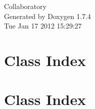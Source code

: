 \documentclass[a4paper]{book}
\begin{document}
\hypersetup{pageanchor=false}
\begin{titlepage}
\vspace*{7cm}
\begin{center}
{\Large Collaboratory }\\
\vspace*{1cm}
{\large Generated by Doxygen 1.7.4}\\
\vspace*{0.5cm}
{\small Tue Jan 17 2012 15:29:27}\\
\end{center}
\end{titlepage}
\clearemptydoublepage
{}
\tableofcontents
\clearemptydoublepage
{}
\hypersetup{pageanchor=true}
\chapter{Class Index}

\chapter{Class Index}

\end{document}
